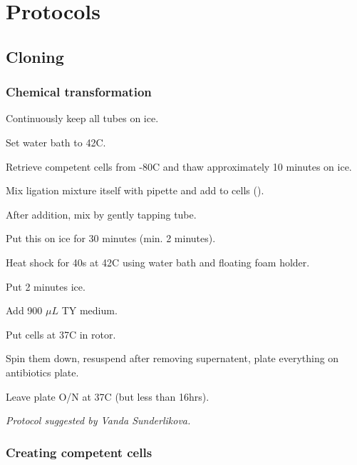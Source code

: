 



\chapter{Protocols}

\section*{Cloning}

\subsection*{Chemical transformation}

\begin{compactitem}
    \item Continuously keep all tubes on ice.
    \item Set water bath to 42C.
    \item Retrieve competent cells from -80C and thaw approximately 10 minutes on ice.
    \item Mix ligation mixture itself with pipette and add to cells ().
    \item After addition, mix by gently tapping tube.
    \item Put this on ice for 30 minutes (min. 2 minutes).
    \item Heat shock for 40s at 42C using water bath and floating foam holder.
    \item Put 2 minutes ice.
    \item Add 900 $\mu L$ TY medium.
    \item Put cells at 37C in rotor.
    \item Spin them down, resuspend after removing supernatent, plate everything on antibiotics plate.
    \item Leave plate O/N at 37C (but less than 16hrs).
\end{compactitem}

\hfill \textit{Protocol suggested by Vanda Sunderlikova.}


\subsection*{Creating competent cells}

